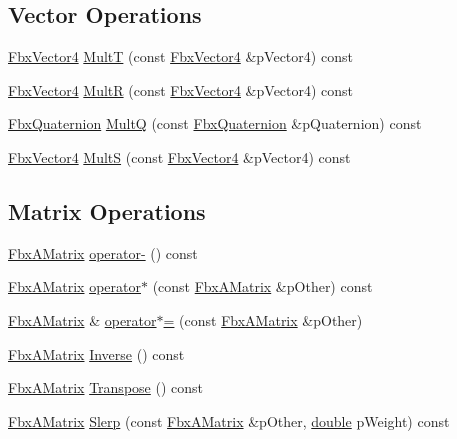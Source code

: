 \subsection*{Vector Operations}
\begin{DoxyCompactItemize}
\item 
\hyperlink{class_fbx_vector4}{Fbx\+Vector4} \hyperlink{class_fbx_a_matrix_ac9d3c8f4232dd1b1996c863b9cca4635}{MultT} (const \hyperlink{class_fbx_vector4}{Fbx\+Vector4} \&p\+Vector4) const
\item 
\hyperlink{class_fbx_vector4}{Fbx\+Vector4} \hyperlink{class_fbx_a_matrix_a9fe3cfea0f753197bd116b429242eb09}{MultR} (const \hyperlink{class_fbx_vector4}{Fbx\+Vector4} \&p\+Vector4) const
\item 
\hyperlink{class_fbx_quaternion}{Fbx\+Quaternion} \hyperlink{class_fbx_a_matrix_a92ea09bd97b85104bff21dde23edca35}{MultQ} (const \hyperlink{class_fbx_quaternion}{Fbx\+Quaternion} \&p\+Quaternion) const
\item 
\hyperlink{class_fbx_vector4}{Fbx\+Vector4} \hyperlink{class_fbx_a_matrix_ae3508b4f0d58debf598bcea9e8dda669}{MultS} (const \hyperlink{class_fbx_vector4}{Fbx\+Vector4} \&p\+Vector4) const
\end{DoxyCompactItemize}
\subsection*{Matrix Operations}
\begin{DoxyCompactItemize}
\item 
\hyperlink{class_fbx_a_matrix}{Fbx\+A\+Matrix} \hyperlink{class_fbx_a_matrix_a8f8ab0b3698f9d25b3051c5928315ef6}{operator-\/} () const
\item 
\hyperlink{class_fbx_a_matrix}{Fbx\+A\+Matrix} \hyperlink{class_fbx_a_matrix_a653885060d7c3966ea2a778a188052c7}{operator$\ast$} (const \hyperlink{class_fbx_a_matrix}{Fbx\+A\+Matrix} \&p\+Other) const
\item 
\hyperlink{class_fbx_a_matrix}{Fbx\+A\+Matrix} \& \hyperlink{class_fbx_a_matrix_a8eba4c43ccc466bebfc555c9170bf3e5}{operator$\ast$=} (const \hyperlink{class_fbx_a_matrix}{Fbx\+A\+Matrix} \&p\+Other)
\item 
\hyperlink{class_fbx_a_matrix}{Fbx\+A\+Matrix} \hyperlink{class_fbx_a_matrix_a4093cf977851b49760e1c24c99d5bae7}{Inverse} () const
\item 
\hyperlink{class_fbx_a_matrix}{Fbx\+A\+Matrix} \hyperlink{class_fbx_a_matrix_a94915f3c5de6c16d4c39a5acc3a84bd7}{Transpose} () const
\item 
\hyperlink{class_fbx_a_matrix}{Fbx\+A\+Matrix} \hyperlink{class_fbx_a_matrix_a1dc557020e7cdaa9de99a87a35cc315e}{Slerp} (const \hyperlink{class_fbx_a_matrix}{Fbx\+A\+Matrix} \&p\+Other, \hyperlink{class_fbx_a_matrix_ad463edbb9fea344643297701f159faa7}{double} p\+Weight) const
\end{DoxyCompactItemize}
